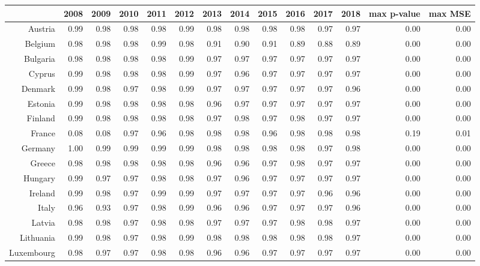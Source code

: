 \documentclass[a4paper,twoside,10pt]{article}
\begin{document}
	\begin{table}[H]
		\centering
		\tabcolsep=0.11cm
		\begin{tabular}{r|rrrrr|rrrrrr|rr}
			\hline
			& 2008 & 2009 & 2010 & 2011 & 2012 & 2013 & 2014 & 2015 & 2016 & 2017 & 2018 & max p-value & max MSE \\ 
			\hline
			Austria & 0.99 & 0.98 & 0.98 & 0.98 & 0.99 & 0.98 & 0.98 & 0.98 & 0.98 & 0.97 & 0.97 & 0.00 & 0.00 \\ 
			Belgium & 0.98 & 0.98 & 0.98 & 0.99 & 0.98 & 0.91 & 0.90 & 0.91 & 0.89 & 0.88 & 0.89 & 0.00 & 0.00 \\ 
			Bulgaria & 0.98 & 0.98 & 0.98 & 0.98 & 0.99 & 0.97 & 0.97 & 0.97 & 0.97 & 0.97 & 0.97 & 0.00 & 0.00 \\ 
			Cyprus & 0.99 & 0.98 & 0.98 & 0.98 & 0.99 & 0.97 & 0.96 & 0.97 & 0.97 & 0.97 & 0.97 & 0.00 & 0.00 \\ 
			Denmark & 0.99 & 0.98 & 0.97 & 0.98 & 0.99 & 0.97 & 0.97 & 0.97 & 0.97 & 0.97 & 0.96 & 0.00 & 0.00 \\ 
			Estonia & 0.99 & 0.98 & 0.98 & 0.98 & 0.98 & 0.96 & 0.97 & 0.97 & 0.97 & 0.97 & 0.97 & 0.00 & 0.00 \\ 
			Finland & 0.99 & 0.98 & 0.98 & 0.98 & 0.98 & 0.97 & 0.98 & 0.97 & 0.98 & 0.97 & 0.97 & 0.00 & 0.00 \\ 
			\rowcolor{cyan} France & 0.08 & 0.08 & 0.97 & 0.96 & 0.98 & 0.98 & 0.98 & 0.96 & 0.98 & 0.98 & 0.98 & 0.19 & 0.01 \\ 
			Germany & 1.00 & 0.99 & 0.99 & 0.99 & 0.99 & 0.98 & 0.98 & 0.98 & 0.98 & 0.97 & 0.98 & 0.00 & 0.00 \\ 
			Greece & 0.98 & 0.98 & 0.98 & 0.98 & 0.98 & 0.96 & 0.96 & 0.97 & 0.98 & 0.97 & 0.97 & 0.00 & 0.00 \\ 
			Hungary & 0.99 & 0.97 & 0.97 & 0.98 & 0.98 & 0.97 & 0.96 & 0.97 & 0.97 & 0.97 & 0.97 & 0.00 & 0.00 \\ 
			Ireland & 0.99 & 0.98 & 0.97 & 0.99 & 0.99 & 0.97 & 0.97 & 0.97 & 0.97 & 0.96 & 0.96 & 0.00 & 0.00 \\ 
			Italy & 0.96 & 0.93 & 0.97 & 0.98 & 0.99 & 0.96 & 0.96 & 0.97 & 0.97 & 0.97 & 0.96 & 0.00 & 0.00 \\ 
			Latvia & 0.98 & 0.98 & 0.97 & 0.98 & 0.98 & 0.97 & 0.97 & 0.97 & 0.98 & 0.98 & 0.97 & 0.00 & 0.00 \\ 
			Lithuania & 0.99 & 0.98 & 0.97 & 0.98 & 0.99 & 0.98 & 0.98 & 0.98 & 0.98 & 0.98 & 0.97 & 0.00 & 0.00 \\ 
			Luxembourg & 0.98 & 0.97 & 0.97 & 0.98 & 0.98 & 0.96 & 0.96 & 0.97 & 0.97 & 0.97 & 0.97 & 0.00 & 0.00 \\ 

\end{tabular}
\end{table}
\end{document}
